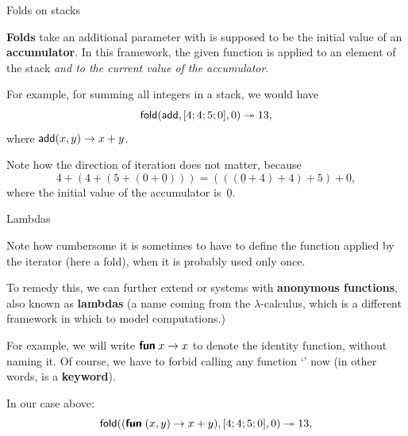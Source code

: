 %
\begin{frame}{Folds on stacks}

  \textbf{Folds} take an additional parameter with is supposed to be
  the initial value of an \textbf{accumulator}. In this framework, the
  given function is applied to an element of the stack \emph{and to
  the current value of the accumulator}.

  \bigskip

  For example, for summing all integers in a stack, we would have
  \begin{equation*}
    \textsf{fold} (\textsf{add}, [4; 4; 5; 0], 0) \twoheadrightarrow 13,
  \end{equation*}
  where $\textsf{add}(x,y) \rightarrow x + y$.

  \bigskip

  Note how the direction of iteration does not matter, because
  \begin{equation*}
    4 + (4 + (5 + (0 + \underline{0})))
    = (((\underline{0} + 4) + 4) + 5) + 0,
  \end{equation*}
  where the initial value of the accumulator is~\(\underline{0}\).

\end{frame}

%
\begin{frame}{Lambdas}

  Note how cumbersome it is sometimes to have to define the function
  applied by the iterator (here a fold), when it is probably used only
  once.

  \bigskip

  To remedy this, we can further extend or systems with
  \textbf{anonymous functions}, also known as \textbf{lambdas} (a
  name coming from the $\lambda$\hyp{}calculus, which is a different
  framework in which to model computations.)

  \bigskip

  For example, we will write $\textsf{\textbf{fun}}\; x \rightarrow x$ to denote the
  identity function, without naming it. Of course, we have to forbid
  calling any function `' now (in other words, \Xfun is a
  \textbf{keyword}).

  \bigskip

  In our case above:
  \begin{equation*}
    \textsf{fold} ((\textsf{\textbf{fun}}\; (x,y) \rightarrow x + y), [4; 4; 5; 0], 0)
    \twoheadrightarrow 13,
  \end{equation*}

\end{frame}

